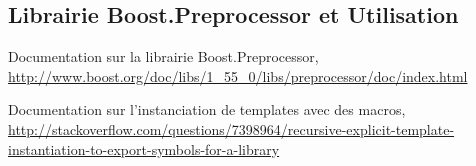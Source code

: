 \documentclass[french,12pt]{article}
\begin{document}
\begin{thebibliography}{99}
\subsection{Librairie Boost.Preprocessor et Utilisation}

Documentation sur la librairie Boost.Preprocessor,\newline
\url{http://www.boost.org/doc/libs/1_55_0/libs/preprocessor/doc/index.html}

Documentation sur l'instanciation de templates avec des macros,  
\url{http://stackoverflow.com/questions/7398964/recursive-explicit-template-instantiation-to-export-symbols-for-a-library}

\end{thebibliography}
\end{document}
